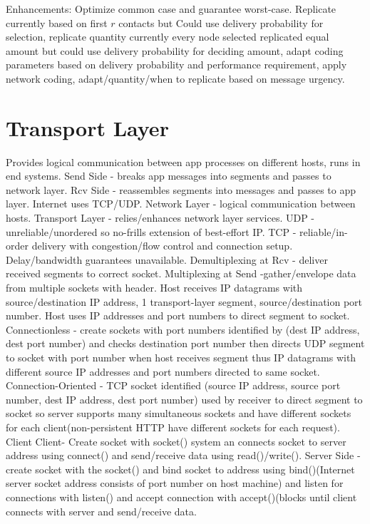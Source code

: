 \documentclass[9pt]{extarticle}
\begin{document}
\begin{multicols}{2}
Enhancements: Optimize common case and guarantee worst-case. Replicate currently based on first $r$ contacts but Could use delivery probability for selection, replicate quantity currently every node selected replicated equal amount but could use delivery probability for deciding amount, adapt coding parameters based on delivery probability and performance requirement, apply network coding, adapt/quantity/when to replicate based on message urgency.

\section{Transport Layer}

Provides logical communication between app processes on different hosts, runs in end systems. Send Side - breaks app messages into segments and passes to network layer. Rcv Side - reassembles segments into messages and passes to app layer. Internet uses TCP/UDP. Network Layer - logical communication between hosts. Transport Layer - relies/enhances network layer services. UDP - unreliable/unordered so no-frills extension of best-effort IP. TCP - reliable/in-order delivery with congestion/flow control and connection setup. Delay/bandwidth guarantees unavailable. Demultiplexing at Rcv - deliver received segments to correct socket. Multiplexing at Send -gather/envelope data from multiple sockets with header. Host receives IP datagrams with source/destination IP address, 1 transport-layer segment, source/destination port number. Host uses IP addresses and port numbers to direct segment to socket. Connectionless - create sockets with port numbers identified by (dest IP address, dest port number) and checks destination port number then directs UDP segment to socket with port number when host receives segment thus IP datagrams with different source IP addresses and port numbers directed to same socket. Connection-Oriented - TCP socket identified (source IP address, source port number, dest IP address, dest port number) used by receiver to direct segment to socket so server supports many simultaneous sockets and have different sockets for each client(non-persistent HTTP have different sockets for each request). Client Client- Create socket with socket() system an connects socket to server address using connect() and send/receive data using read()/write(). Server Side - create socket with the socket() and bind socket to address using bind()(Internet server socket address consists of port number on host machine) and listen for connections with listen() and accept connection with accept()(blocks until client connects with server and send/receive data.


\end{multicols}
\end{document}
